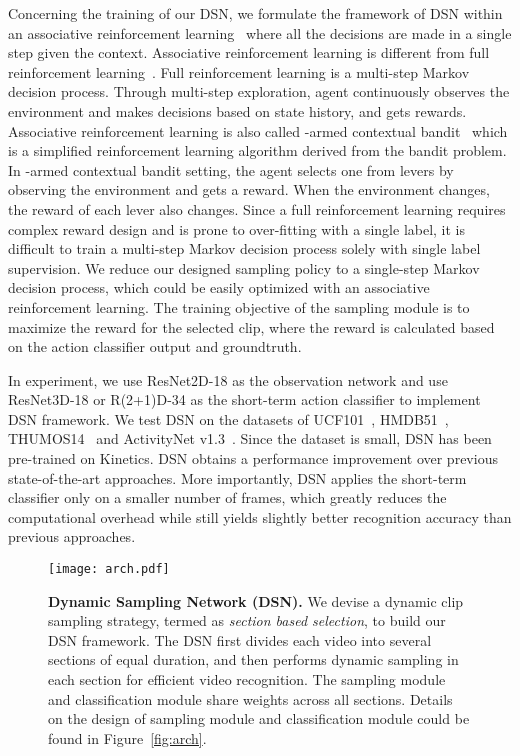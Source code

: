 \documentclass[journal]{IEEEtran}
\begin{document}
Concerning the training of our DSN, we formulate the framework of DSN within an associative reinforcement learning~\cite{associative} where all the decisions are made in a single step given the context.
Associative reinforcement learning is different from full reinforcement learning~\cite{SuttonB98}.
Full reinforcement learning is a multi-step Markov decision process.
Through multi-step exploration, agent continuously observes the environment and makes decisions based on state history, and gets rewards.
Associative reinforcement learning is also called -armed contextual bandit~\cite{bandit} which is a simplified reinforcement learning algorithm derived from the bandit problem.
In -armed contextual bandit setting, the agent selects one from  levers by observing the environment and gets a reward.
When the environment changes, the reward of each lever also changes.
Since a full reinforcement learning requires complex reward design and is prone to over-fitting with a single label, it is difficult to train a multi-step Markov decision process solely with single label supervision.
We reduce our designed sampling policy to a single-step Markov decision process, which could be easily optimized with an associative reinforcement learning.
The training objective of the sampling module is to maximize the reward for the selected clip, where the reward is calculated based on the action classifier output and groundtruth.

In experiment, we use ResNet2D-18 as the observation network and use ResNet3D-18 or R(2+1)D-34 as the short-term action classifier to implement DSN framework.
We test DSN on the datasets of UCF101~\cite{abs-1212-0402}, HMDB51~\cite{KuehneJGPS11}, THUMOS14~\cite{THUMOS14} and ActivityNet v1.3~\cite{anet}.
Since the dataset is small, DSN has been pre-trained on Kinetics.
DSN obtains a performance improvement over previous state-of-the-art approaches.
More importantly, DSN applies the short-term classifier only on a smaller number of frames, which greatly reduces the computational overhead while still yields slightly better recognition accuracy than previous approaches.



\begin{figure*}[ht]
  \centering
  \texttt{[image: arch.pdf]}
  \caption{\textbf{Dynamic Sampling Network (DSN).} We devise a dynamic clip sampling strategy, termed as {\em section based selection}, to build our DSN framework. The DSN first divides each video into several sections of equal duration, and then performs dynamic sampling in each section for efficient video recognition. The sampling module and classification module share weights across all sections. Details on the design of sampling module and classification module could be found in Figure~\ref{fig:arch}. }
  \label{fig:arch2}
\end{figure*}
\end{document}
